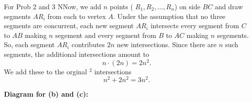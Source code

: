 \documentclass{report}
\begin{document}
\begin{RemarkWithLily}{For Prob 2 and 3}
  NNow, we add \(n\) points ( \(R_1, R_2, \dots, R_n\)) on side \(BC\) and draw segments \(AR_i\) from each to vertex \(A\). Under the assumption that no three segments are concurrent, each new segment \(AR_i\) intersects every segment from \(C\) to \(AB\) making \(n\) segement and every segment from \(B\) to \(AC\) making \(n\) segements. So, each segment \(AR_i\) contributes \(2n\) new intersections. Since there are \(n\) such segments, the additional intersections amount to
  \[
  n \cdot (2n) = 2n^2.
  \]
  We add these to the orginal $^{2}$ intersections
  \[
  n^2 + 2n^2 = 3n^2.
  \]
  \bigskip

  \textbf{Diagram for (b) and (c):}

  \bigskip

  \begin{center}
  \end{center}

\end{RemarkWithLily}
\end{document}
